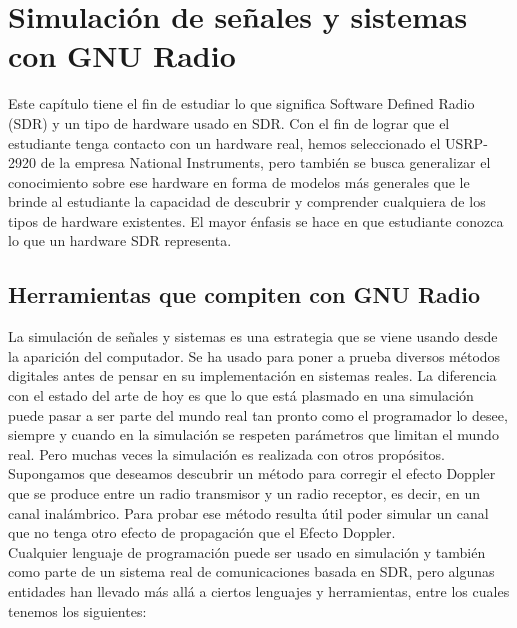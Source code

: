 \chapter{Simulación de señales y sistemas con GNU Radio}

Este capítulo tiene el fin de estudiar lo que significa Software Defined Radio (SDR) y un tipo de hardware usado en SDR. Con el fin de lograr que el estudiante tenga contacto con un hardware real, hemos seleccionado el USRP-2920 de la empresa National Instruments, pero también se busca generalizar el conocimiento sobre ese hardware en forma de modelos más generales que le brinde al estudiante la capacidad de descubrir y comprender cualquiera de los tipos de hardware existentes. El mayor énfasis se hace en que estudiante conozca lo que un hardware SDR representa. \\

\section{Herramientas que compiten con GNU Radio}
La simulación de señales y sistemas es una estrategia que se viene usando desde la aparición del computador. Se ha usado para poner a prueba diversos métodos digitales antes de pensar en su implementación en sistemas reales. La diferencia con el estado del arte de hoy es que lo que está plasmado en una simulación puede pasar a ser parte del mundo real tan pronto como el programador lo desee, siempre y cuando en la simulación se respeten parámetros que limitan el mundo real. Pero muchas veces la simulación es realizada con otros propósitos. Supongamos que deseamos descubrir un método para corregir el efecto Doppler que se produce entre un radio transmisor y un radio receptor, es decir, en un canal inalámbrico. Para probar ese método resulta útil poder simular un canal que no tenga otro efecto de propagación que el Efecto Doppler.\\ 

Cualquier lenguaje de programación puede ser usado en simulación y también como parte de un sistema real de comunicaciones basada en SDR, pero algunas entidades han llevado más allá a ciertos lenguajes y herramientas, entre los cuales tenemos los siguientes:

